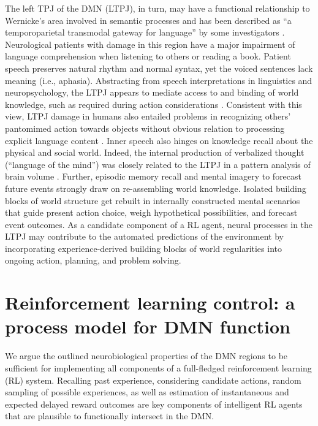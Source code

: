 \documentclass[10pt,letterpaper]{article}
\begin{document}
The left TPJ of the DMN (LTPJ),
in turn, may have a functional relationship to Wernicke's area
involved in semantic processes \citep{blumenfeld_book} and has
been described as ``a temporoparietal transmodal gateway for language''
by some investigators \citep{mesulam_book}.
Neurological patients with damage in this region
have a major impairment of language comprehension
when listening to others or reading a book.
Patient speech
preserves natural rhythm and normal syntax, yet the
voiced sentences lack meaning (i.e., aphasia).
Abstracting from speech interpretations in linguistics
and neuropsychology,
the LTPJ appears to mediate access to and binding of world knowledge,
such as required during action considerations
\citep{binder2011neurobiology, seghier2013angular}.
Consistent with this view,
LTPJ damage in humans also entailed problems in recognizing
others' pantomimed action towards objects
without obvious relation to processing explicit language content
\citep{varney1987locus}.
%
Inner speech also hinges on knowledge recall
about the physical and social world.
Indeed,
the internal production of
verbalized thought (``language of the mind'') was closely related to the LTPJ
in a pattern analysis of brain volume
\citep{geva2011neural}.
Further,
episodic memory recall and mental imagery to forecast future events strongly draw on
re-assembling world knowledge.
Isolated building blocks of world structure get rebuilt
in internally constructed mental scenarios that
guide present action choice,
weigh hypothetical possibilities, and forecast event outcomes.
%
As a candidate component of a RL agent,
neural processes in the LTPJ may
contribute to the automated predictions of the environment
by incorporating experience-derived building blocks of world regularities
into ongoing action, planning, and problem solving.



\section{Reinforcement learning control: a process model for DMN function}
We argue the outlined neurobiological properties
of the DMN regions
to be sufficient for implementing all components
of a full-fledged reinforcement learning (RL) system.
Recalling past experience, considering candidate actions,
random sampling of possible experiences, as well as
estimation of instantaneous and expected delayed reward outcomes
are key components of intelligent RL agents
that are plausible to functionally intersect in the DMN.
\end{document}
